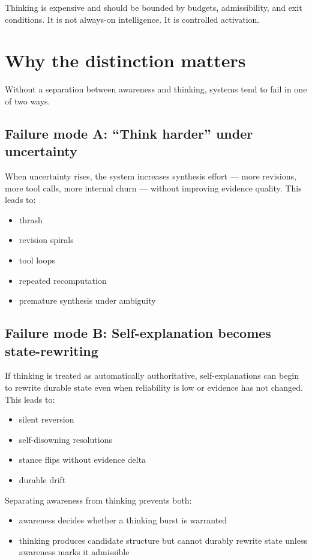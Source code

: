 \documentclass[11pt]{article}
\begin{document}
Thinking is expensive and should be bounded by budgets, admissibility, and exit conditions. It is not always-on intelligence. It is controlled activation.

\section{Why the distinction matters}
Without a separation between awareness and thinking, systems tend to fail in one of two ways.

\subsection{Failure mode A: \enquote{Think harder} under uncertainty}
When uncertainty rises, the system increases synthesis effort --- more revisions, more tool calls, more internal churn --- without improving evidence quality. This leads to:
\begin{itemize}[leftmargin=2em]
  \item thrash
  \item revision spirals
  \item tool loops
  \item repeated recomputation
  \item premature synthesis under ambiguity
\end{itemize}

\subsection{Failure mode B: Self-explanation becomes state-rewriting}
If thinking is treated as automatically authoritative, self-explanations can begin to rewrite durable state even when reliability is low or evidence has not changed. This leads to:
\begin{itemize}[leftmargin=2em]
  \item silent reversion
  \item self-disowning resolutions
  \item stance flips without evidence delta
  \item durable drift
\end{itemize}

Separating awareness from thinking prevents both:
\begin{itemize}[leftmargin=2em]
  \item awareness decides whether a thinking burst is warranted
  \item thinking produces candidate structure but cannot durably rewrite state unless awareness marks it admissible
\end{itemize}
\end{document}
